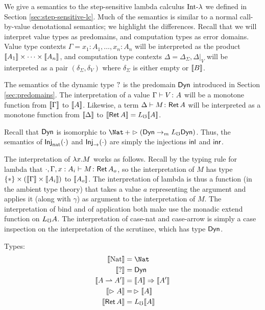 We give a semantics to the step-sensitive lambda calculus $\text{Int-}\lambda$ we defined
in Section \ref{sec:step-sensitive-lc}.
%
Much of the semantics is similar to a normal call-by-value denotational semantics;
we highlight the differences.
Recall that we will interpret value types as predomains, and computation types
as error domains. Value type contexts $\Gamma = x_1 \colon A_1, \dots, x_n \colon A_n$
will be interpreted as the product $\llbracket {A_1} \rrbracket \times \cdots \times \llbracket {A_n} \rrbracket$, and
computation type contexts $\Delta = \Delta_\Sigma , \Delta|_V$ will be interpreted as a pair
$(\delta_\Sigma, \delta_V)$ where $\delta_\Sigma$ is either empty or $\llbracket {B} \rrbracket$.


The semantics of the dynamic type $?$ is the predomain $\mathsf{Dyn}$ introduced in Section
\ref{sec:predomains}.
%
The interpretation of a value ${\Gamma} \vdash {V} \colon {A}$ will be a monotone function from
$\llbracket {\Gamma} \rrbracket$ to $\llbracket {A} \rrbracket$. Likewise, a term ${\Delta} \vdash {M} \colon {\mathsf{Ret\,}{A}}$ will be interpreted
as a monotone function from $\llbracket {\Delta} \rrbracket$ to $\llbracket {\mathsf{Ret\,}{A}} \rrbracket = L_\mho \llbracket {A} \rrbracket$.

Recall that $\mathsf{Dyn}$ is isomorphic to $\Nat\, + \later (\Dyn \monto \li \Dyn)$.
Thus, the semantics of $\textsf{Inj}_\text{nat} ({\cdot})$ and $\textsf{Inj}_\to ({\cdot})$ are simply the
injections $\mathsf{inl}$ and $\mathsf{inr}$.

The interpretation of $\lambda {x} . {M}$ works as follows. Recall by the typing rule for
lambda that ${\cdot, \Gamma, x : A_i} \vdash {M} \colon {\mathsf{Ret\,}{A_o}}$, so the interpretation of $M$
has type $\{*\} \times (\llbracket {\Gamma} \rrbracket \times \llbracket {A_i} \rrbracket)$ to $\llbracket {A_o} \rrbracket$.
The interpretation of lambda is thus a function (in the ambient type theory) that takes
a value $a$ representing the argument and applies it (along with $\gamma$) as argument to
the interpretation of $M$.
%
The interpretation of bind and of application both make use the monadic extend function on $L_\mho A$.
%
The interpretation of case-nat and case-arrow is simply a case inspection on the
interpretation of the scrutinee, which has type $\mathsf{Dyn}$.


\vspace{2ex}


\noindent Types:
\begin{align*}
  \sem{\nat} &= \Nat \\
  \sem{\dyn} &= \Dyn \\
  \sem{A \ra A'} &= \sem{A} \To \sem{A'} \\
  \sem{\later A} &=\, \later \sem{A} \\
  \sem{\Ret A} &= \li \sem{A}
\end{align*}

